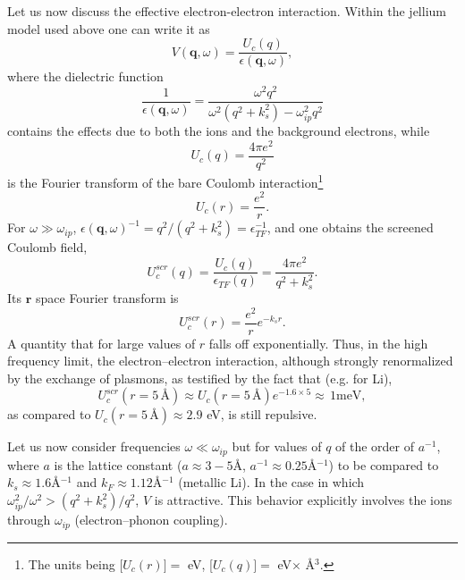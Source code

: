 Let us now discuss the effective electron-electron interaction. Within the jellium model used above one can write it as
\begin{equation}\label{eqC2AppA14}
V(\mathbf q,\omega)=\frac{U_c(q)}{\epsilon(\mathbf q,\omega)},
\end{equation}
where the dielectric function
\begin{equation}\label{eqC2AppA15}
\frac{1}{\epsilon(\mathbf q,\omega)}=\frac{\omega^2q^2}{\omega^2(q^2+k_s^2)-\omega^2_{ip}q^2}
\end{equation}
contains the effects due to both the ions and the background electrons, while
\begin{equation}\label{eqC2AppA16}
U_c(q)=\frac{4\pi e^2}{q^2}
\end{equation}
is the Fourier transform of the bare Coulomb interaction\footnote{The units being [$U_c(r)]=$ eV, [$U_c(q)]=$ eV$\times$ \AA$^3$.}
\begin{equation}\label{eqC2AppA17}
U_c(r)=\frac{e^2}{r}.
\end{equation}
For $\omega\gg \omega_{ip}$, $\epsilon(\mathbf q,\omega)^{-1}=q^2/(q^2+k_s^2)=\epsilon_{TF}^{-1}$, and  one obtains the  screened Coulomb field,
\begin{equation}\label{eqC2AppA18}
U_c^{scr}(q)=\frac{U_c(q)}{\epsilon_{TF}(q)}=\frac{4\pi e^2}{q^2+k_s^2}.
\end{equation}
Its $\mathbf r$ space Fourier transform is 
\begin{equation}\label{eqC2AppA19}
U_c^{scr}(r)=\frac{e^2}{r}e^{-k_s r}.
\end{equation}
A quantity that for large values of $r$ falls off exponentially. Thus, in the high frequency limit, the electron--electron interaction, although strongly renormalized by the exchange of plasmons, as testified by the fact that (e.g. for Li),
\begin{equation}\label{eqC2AppA20}
U_c^{scr}(r=5\,\text{\AA})\approx U_c(r=5\,\text{\AA})e^{-1.6\times 5}\approx \,1\text{meV},
\end{equation}
as compared to $U_c(r=5\,\text{\AA})\approx 2.9$ eV, is still repulsive.


Let us now consider frequencies $\omega\ll \omega_{ip}$ but for values of $q$ of the order of $a^{-1}$, where $a$ is the lattice constant ($a\approx 3-5$\AA, $a^{-1}\approx 0.25$\AA$^{-1}$) to be compared to $k_s\approx 1.6 $\AA$^{-1}$ and $k_F\approx 1.12$\AA$^{-1}$ (metallic Li). In the case in which $\omega_{ip}^2/\omega^2>(q^2+k_s^2)/q^2$, $V$ is attractive.  This behavior explicitly involves the ions through $\omega_{ip}$ (electron--phonon coupling). 


